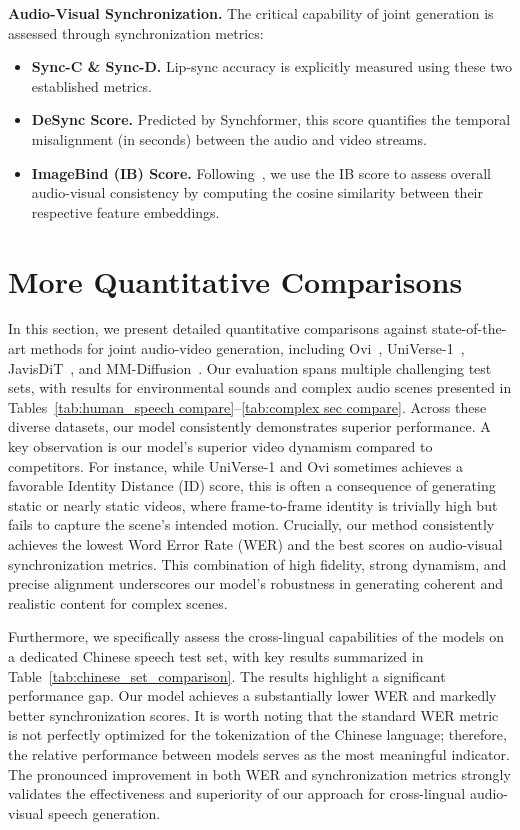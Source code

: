 \noindent\textbf{Audio-Visual Synchronization.} The critical capability of joint generation is assessed through synchronization metrics:
\begin{itemize}
    \item \textbf{Sync-C \& Sync-D.} Lip-sync accuracy is explicitly measured using these two established metrics\cite{chung2016syncnet}.
    \item \textbf{DeSync Score.} Predicted by Synchformer\cite{iashin2024synchformer}, this score quantifies the temporal misalignment (in seconds) between the audio and video streams.
    \item \textbf{ImageBind (IB) Score.} Following~\cite{girdhar2023imagebind}, we use the IB score to assess overall audio-visual consistency by computing the cosine similarity between their respective feature embeddings.
\end{itemize}


\section{More Quantitative Comparisons}
\label{sec:more_quantitative_comparisons}

In this section, we present detailed quantitative comparisons against state-of-the-art methods for joint audio-video generation, including Ovi~\cite{low2025ovi}, UniVerse-1~\cite{wang2025universe}, JavisDiT~\cite{liu2025javisdit}, and MM-Diffusion~\cite{ruan2023mmdiffusion}. Our evaluation spans multiple challenging test sets, with results for environmental sounds and complex audio scenes presented in Tables~\ref{tab:human_speech compare}--\ref{tab:complex sec compare}. Across these diverse datasets, our model consistently demonstrates superior performance. A key observation is our model's superior video dynamism compared to competitors. For instance, while UniVerse-1 and Ovi sometimes achieves a favorable Identity Distance (ID) score, this is often a consequence of generating static or nearly static videos, where frame-to-frame identity is trivially high but fails to capture the scene's intended motion. Crucially, our method consistently achieves the lowest Word Error Rate (WER) and the best scores on audio-visual synchronization metrics. This combination of high fidelity, strong dynamism, and precise alignment underscores our model's robustness in generating coherent and realistic content for complex scenes.

Furthermore, we specifically assess the cross-lingual capabilities of the models on a dedicated Chinese speech test set, with key results summarized in Table~\ref{tab:chinese_set_comparison}. The results highlight a significant performance gap. Our model achieves a substantially lower WER and markedly better synchronization scores. It is worth noting that the standard WER metric is not perfectly optimized for the tokenization of the Chinese language; therefore, the relative performance between models serves as the most meaningful indicator. The pronounced improvement in both WER and synchronization metrics strongly validates the effectiveness and superiority of our approach for cross-lingual audio-visual speech generation.



